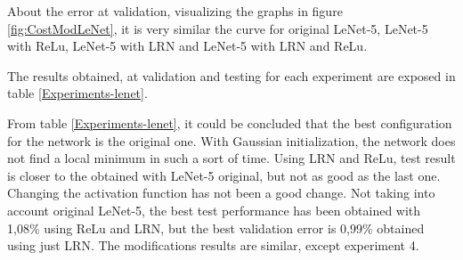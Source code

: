 About the error at validation, visualizing the graphs in figure \ref{fig:CostModLeNet}, it is very similar the curve for original LeNet-5, LeNet-5 with ReLu, LeNet-5 with LRN and LeNet-5 with LRN and ReLu.\\
\clearpage

The results obtained, at validation and testing for each experiment are exposed in table \ref{Experiments-lenet}. 

\begin{table}[htb]
\centering
{}
\caption{Lenet-5 experiments results.}
\label{Experiments-lenet}
\end{table}

From table \ref{Experiments-lenet}, it could be concluded that the best configuration for the network is the original one. With Gaussian initialization, the network does not find a local minimum in such a sort of time. Using LRN and ReLu, test result is closer to the obtained with LeNet-5 original, but not as good as the last one. Changing the activation function has not been a good change. Not taking into account original LeNet-5, the best test performance has been obtained with 1,08\% using ReLu and LRN, but the best validation error is 0,99\% obtained using just LRN. The modifications results are similar, except experiment 4.

